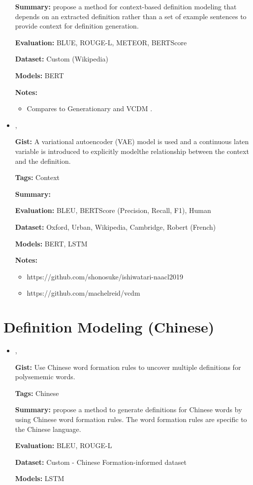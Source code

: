 \documentclass{article}[a4paper]
\newcommand{\bitem}[2]{
    \item[\cite{#1}]
        \textbf{\citetitle{#1}}

        \citeauthor{#1}, \citeyear{#1}
        \newline\newline
        {#2}
}%
\begin{document}
\begin{itemize}
{        \textbf{Summary:}
        \citeauthor{huang_cdm_2021} propose a method for context-based
        definition modeling that depends on an extracted definition rather than
        a set of example sentences to provide context for definition generation.

        \textbf{Evaluation:}
        BLUE, ROUGE-L, METEOR, BERTScore

        \textbf{Dataset:}
        Custom (Wikipedia)

        \textbf{Models:}
        BERT

        \textbf{Notes:}
        \begin{itemize}
            \item Compares to Generationary \cite{bevilacqua_generationary_2020}
                  and VCDM \cite{reid_vcdm_2020}.
        \end{itemize}
    }%

    \bitem{reid_vcdm_2020}%
    {%
        \textbf{Gist:}
        A variational autoencoder (VAE) model is used and a continuous laten
        variable is introduced to explicitly modelthe relationship between the
        context and the definition.

        \textbf{Tags:}
        Context

        \textbf{Summary:}

        \textbf{Evaluation:}
        BLEU, BERTScore (Precision, Recall, F1), Human

        \textbf{Dataset:}
        Oxford, Urban, Wikipedia, Cambridge, Robert (French)

        \textbf{Models:}
        BERT, LSTM

        \textbf{Notes:}
        \begin{itemize}
            \item https://github.com/shonosuke/ishiwatari-naacl2019
            \item https://github.com/machelreid/vcdm
        \end{itemize}
    }%
\end{itemize}

\section{Definition Modeling (Chinese)}
\begin{itemize}
    \bitem{zhu_multi_2019}%
    {%
        \textbf{Gist:}
        Use Chinese word formation rules to uncover multiple definitions for
        polysememic words.

        \textbf{Tags:}
        Chinese

        \textbf{Summary:}
        \citeauthor{zhu_multi_2019} propose a method to generate definitions for
        Chinese words by using Chinese word formation rules. The word formation
        rules are specific to the Chinese language.

        \textbf{Evaluation:}
        BLEU, ROUGE-L

        \textbf{Dataset:}
        Custom - Chinese Formation-informed dataset

        \textbf{Models:}
        LSTM
    }%
\end{itemize}
\end{document}
